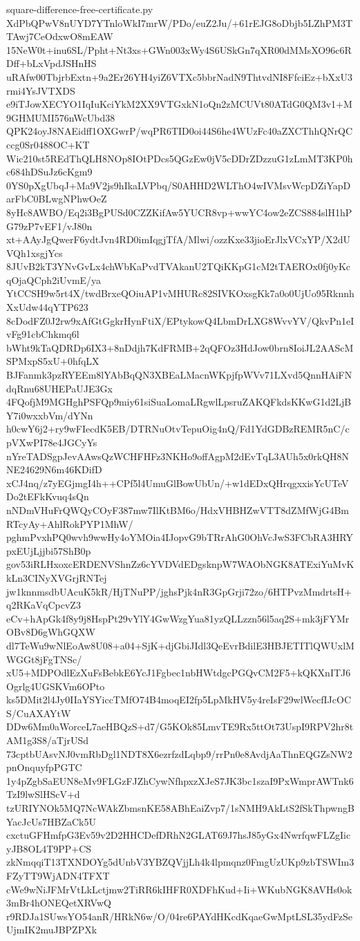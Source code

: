 \documentclass[11pt]{article}
\theoremstyle{definition}
\theoremstyle{remark}
\begin{document}
\begin{filecontents*}[overwrite]{square-difference-free-certificate.py}
XdPbQPwV8nUYD7YTnloWkI7mrW/PDo/euZ2Ju/+61rEJG8oDbjb5LZhPM3TTAwj7CeOdxwO8mEAW
15NeW0t+inu6SL/Ppht+Nt3xs+GWn003xWy4S6USkGn7qXR00dMMsXO96c6RDff+bLxVpdJSHnHS
uRAfw00TbjrbExtn+9a2Er26YH4yiZ6VTXc5bbrNadN9ThtvdNI8FfciEz+bXxU3rmi4YsJVTXDS
e9iTJowXECYO1IqIuKciYkM2XX9VTGxkN1oQn2zMCUVt80ATdG0QM3v1+M9GHMUMI576nWcUbd38
QPK24oyJ8NAEidff1OXGwrP/wqPR6TID0oi44S6he4WUzFc40aZXCThhQNrQCccg0Sr0488OC+KT
Wic210st5REdThQLH8NOp8IOtPDcs5QGzEw0jV5cDDrZDzzuG1zLmMT3KP0hc684hDSuJz6cKgm9
0YS0pXgUbqJ+Ma9V2js9hIkaLVPbq/S0AHHD2WLThO4wIVMsvWcpDZiYapDarFbC0BLwgNPhwOeZ
8yHc8AWBO/Eq2i3BgPUSd0CZZKifAw5YUCR8vp+wwYC4ow2eZCS884slH1hPG79zP7vEF1/vJ80n
xt+AAyJgQwerF6ydtJvn4RD0imIqgjTfA/Mlwi/ozzKxe33jioErJlxVCxYP/X2dUVQh1xsgjYcs
8JUvB2kT3YNvGvLx4chWbKaPvdTVAkanU2TQiKKpG1cM2tTAEROx0fj0yKcqOjaQCph2iUvmE/ya
YtCCSH9w5rt4X/twdBrxeQOiuAP1vMHURc82SIVKOxsgKk7a0o0UjUo95RknnhXxUdw44qYTP623
8cDodFZ0J2rw9xAfGtGgkrHynFtiX/EPtykowQ4LbmDrLXG8WvvYV/QkvPn1eIvFg91cbChkmq6l
bWht9kTaQDRDp6IX3+8nDdjh7KdFRMB+2qQFOz3HdJow0brn8IoiJL2AAScMSPMxpS5xU+0hfqLX
BJFanmk3pzRYEEm8lYAbBqQN3XBEaLMacnWKpjfpWVv71LXvd5QnnHAiFNdqRnu68UHEPaUJE3Gx
4FQofjM9MGHghPSFQp9miy61siSuaLomaLRgwlLpsruZAKQFkdsKKwG1d2LjBY7i0wxxbVm/dYNn
h0cwY6j2+ry9wFIecdK5EB/DTRNuOtvTepuOig4nQ/Fd1YdGDBzREMR5nC/cpVXwPI78e4JGCyYs
nYreTADSgpJevAAwsQzWCHFHFz3NKHo9offAgpM2dEvTqL3AUh5x0rkQH8NNE24629N6m46KDifD
xCJ4nq/z7yEGjmgI4h++CPf5l4UmuGlBowUbUn/+w1dEDxQHrqgxxisYcUTeVDo2tEFkKvuq4sQn
nNDmVHuFrQWQyCOyF387mw7IlKtBM6o/HdxVHBHZwVTT8dZMfWjG4BmRTcyAy+AhlRokPYP1MhW/
pghmPvxhPQ0wvh9wwHy4oYMOia4IJopvG9bTRrAhG0OhVcJwS3FCbRA3HRYpxEUjLjjbi57ShB0p
gov53iRLHxoxcERDENVShnZz6cYVDVdEDgsknpW7WAObNGK8ATExiYuMvKkLn3CINyXVGrjRNTej
jw1knnmsdbUAcuK5kR/HjTNuPP/jghsPjk4nR3GpGrji72zo/6HTPvzMmdrtsH+q2RKaVqCpcvZ3
eCv+hApGk4f8y9j8HspPt29vYlY4GwWzgYua81yzQLLzzn56l5aq2S+mk3jFYMrOBv8D6gWhGQXW
dl7TeWu9wNlEoAw8U08+a04+SjK+djGbiJIdl3QeEvrBdilE3HBJETITlQWUxlMWGGt8jFgTNSc/
xU5+MDPOdlEzXuFsBebkE6YcJ1Fgbec1nbHWtdgcPGQvCM2F5+kQKXnITJ6Ogrlg4UGSKVm6OPto
ks5DMit2l4Jy0IIaYSYiccTMfO74B4moqEI2fp5LpMkHV5y4reIsF29wlWecfIJcOCS/CuAXAYtW
DDw6Mm0aWorceL7aeHBQzS+d7/G5KOk85LmvTE9Rx5ttOt73UspI9RPV2hr8tAM1g3S8/aTjrUSd
73cptbUAsvNJ0vmRbDgl1NDT8X6ezrfzdLqbp9/rrPn0e8AvdjAaThnEQGZsNW2pnOnquyfpPGTC
1y4pZgbSaEUN8eMv9FLGzFJZhCywNfhpxzXJeS7JK3bc1szaI9PxWmprAWTnk6TzI9lwSlHScV+d
tzURIYNOk5MQ7NcWAkZbmsnKE58ABhEaiZvp7/1sNMH9AkLtS2fSkThpwngBYacJcUs7HBZaCk5U
cxctuGFHmfpG3Ev59v2D2HHCDefDRhN2GLAT69J7hsJ85yGx4NwrfqwFLZgIicyJB8OL4T9PP+CS
zkNmqqiT13TXNDOYg5dUnbV3YBZQVjjLh4k4lpmqnz0FmgUzUKp9zbTSWIm3FZyTT9WjADN4TFXT
cWe9wNiJFMrVtLkLctjmw2TiRR6kIHFR0XDFhKud+Ii+WKubNGK8AVHs0ok3mBr4hONEQetXRVwQ
r9RDJa1SUwsYO54anR/HRkN6w/O/04re6PAYdHKcdKqaeGwMptLSL35ydFzSeUjmIK2muJBPZPXk

\end{filecontents*}
\end{document}
